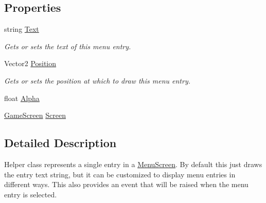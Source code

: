 \subsection*{Properties}
\begin{DoxyCompactItemize}
\item 
string \hyperlink{classgearit_1_1xna_1_1_menu_entry_a4c9cc29aa9d4312a5349ed2cf1639655}{Text}
\begin{DoxyCompactList}\small\item\em Gets or sets the text of this menu entry. \end{DoxyCompactList}\item 
Vector2 \hyperlink{classgearit_1_1xna_1_1_menu_entry_a2f1edd60412c1051d8038fa3a2bbfff4}{Position}
\begin{DoxyCompactList}\small\item\em Gets or sets the position at which to draw this menu entry. \end{DoxyCompactList}\item 
float \hyperlink{classgearit_1_1xna_1_1_menu_entry_a7f6ac993a7eab9463451725d77433cbc}{Alpha}
\item 
\hyperlink{classgearit_1_1xna_1_1_game_screen}{Game\+Screen} \hyperlink{classgearit_1_1xna_1_1_menu_entry_a83543c01ecdf4bd04bde3f98b1a44977}{Screen}
\end{DoxyCompactItemize}


\subsection{Detailed Description}
Helper class represents a single entry in a \hyperlink{classgearit_1_1xna_1_1_menu_screen}{Menu\+Screen}. By default this just draws the entry text string, but it can be customized to display menu entries in different ways. This also provides an event that will be raised when the menu entry is selected. 



